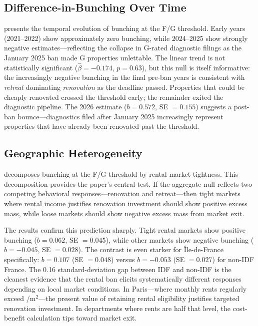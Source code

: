 \documentclass[12pt]{article}
\begin{document}
\subsection{Difference-in-Bunching Over Time}



 presents the temporal evolution of bunching at the F/G threshold. Early years (2021--2022) show approximately zero bunching, while 2024--2025 show strongly negative estimates---reflecting the collapse in G-rated diagnostic filings as the January 2025 ban made G properties unlettable. The linear trend is not statistically significant ($\hat{\beta} = -0.174$, $p = 0.63$), but this null is itself informative: the increasingly negative bunching in the final pre-ban years is consistent with \textit{retreat} dominating \textit{renovation} as the deadline passed. Properties that could be cheaply renovated crossed the threshold early; the remainder exited the diagnostic pipeline. The 2026 estimate ($b = 0.572$, SE $= 0.155$) suggests a post-ban bounce---diagnostics filed after January 2025 increasingly represent properties that have already been renovated past the threshold.


\subsection{Geographic Heterogeneity}



 decomposes bunching at the F/G threshold by rental market tightness. This decomposition provides the paper's central test. If the aggregate null reflects two competing behavioral responses---renovation and retreat---then tight markets where rental income justifies renovation investment should show positive excess mass, while loose markets should show negative excess mass from market exit.

The results confirm this prediction sharply. Tight rental markets show positive bunching ($b = 0.062$, SE $= 0.045$), while other markets show negative bunching ($b = -0.045$, SE $= 0.028$). The contrast is even starker for \^{I}le-de-France specifically: $b = 0.107$ (SE $= 0.048$) versus $b = -0.053$ (SE $= 0.027$) for non-IDF France. The 0.16 standard-deviation gap between IDF and non-IDF is the cleanest evidence that the rental ban elicits systematically different responses depending on local market conditions. In Paris---where monthly rents regularly exceed /m$^2$---the present value of retaining rental eligibility justifies targeted renovation investment. In departments where rents are half that level, the cost-benefit calculation tips toward market exit.
\end{document}
